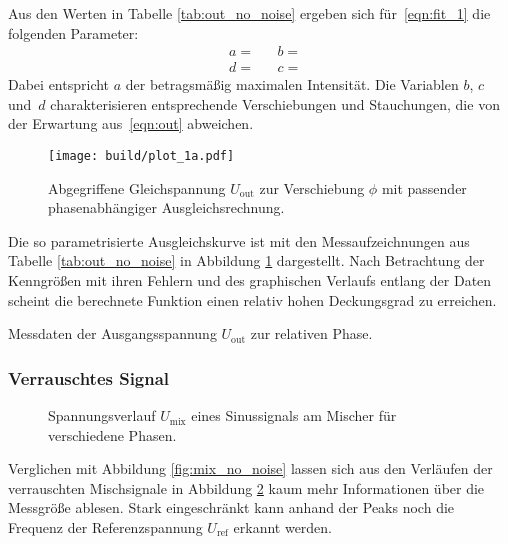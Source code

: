 Aus den Werten in Tabelle \ref{tab:out_no_noise} ergeben sich für~\eqref{eqn:fit_1} die folgenden Parameter:
\begin{align*}
	&a =  &
	&b =  \\
	&d =  &
	&c = 
\end{align*}
Dabei entspricht $a$ der betragsmäßig maximalen Intensität. Die Variablen $b$, $c$ \mbox{und $d$}
charakterisieren entsprechende Verschiebungen und Stauchungen, die von der Erwartung
aus~\eqref{eqn:out} abweichen.

\begin{figure}[H]
	\texttt{[image: build/plot\_1a.pdf]}
	\caption{Abgegriffene Gleichspannung $U_{\! \text{out}}$ zur Verschiebung $\phi$ mit passender
			 phasenabhängiger Ausgleichsrechnung.}
	\label{fig:out_no_noise}
\end{figure}
Die so parametrisierte Ausgleichskurve ist mit den Messaufzeichnungen aus Tabelle \ref{tab:out_no_noise}
in Abbildung \ref{fig:out_no_noise} dargestellt. Nach Betrachtung der Kenngrößen mit ihren Fehlern und
des graphischen Verlaufs entlang der Daten scheint die berechnete Funktion einen relativ hohen Deckungsgrad
zu erreichen.

\begin{table}[H]
	\vspace{1.35ex}
	\centering
	\captionsetup{width=0.75\linewidth}
	\caption{Messdaten der Ausgangsspannung $U_{\! \text{out}}$ zur relativen Phase.}
	
	\label{tab:out_no_noise}
\end{table}

\subsubsection{Verrauschtes Signal}

\begin{figure}
	
	\captionsetup{width=0.975\linewidth}
	\caption{Spannungsverlauf $U_{\! \text{mix}}$ eines Sinussignals am Mischer für verschiedene Phasen.}
	\label{fig:mix_with_noise}
\end{figure}

Verglichen mit Abbildung \ref{fig:mix_no_noise} lassen sich aus den Verläufen der verrauschten Mischsignale
in Abbildung \ref{fig:mix_with_noise} kaum mehr Informationen über die Messgröße ablesen. Stark eingeschränkt
kann anhand der Peaks noch die Frequenz der Referenzspannung $U_{\! \text{ref}}$ erkannt werden. 


